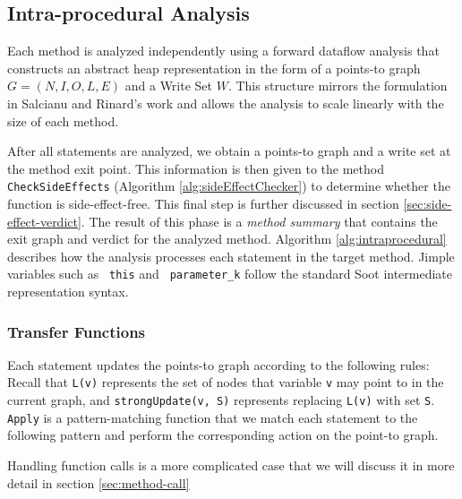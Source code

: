 \documentclass{article}
\begin{document}
\subsection{Intra-procedural Analysis}

Each method is analyzed independently using a forward dataflow analysis that constructs an abstract heap representation in the form of a points-to graph $G = (N, I, O, L, E)$ and a Write Set $W$. This structure mirrors the formulation in Salcianu and Rinard's work \cite{salcianu2005purity} and allows the analysis to scale linearly with the size of each method. 

After all statements are analyzed, we obtain a points-to graph and a write set at the method exit point. This information is then given to the method \texttt{CheckSideEffects} (Algorithm \ref{alg:sideEffectChecker}) to determine whether the function is side-effect-free. This final step is further discussed in section \ref{sec:side-effect-verdict}. 
The result of this phase is a \emph{method summary} that contains the exit graph and verdict for the analyzed method. 
Algorithm \ref{alg:intraprocedural} describes how the analysis processes each statement in the target method. Jimple variables such as \texttt{ this} and \texttt{ parameter\_k} follow the standard Soot intermediate representation syntax. 




\subsubsection{Transfer Functions}
Each statement updates the points-to graph according to the following rules: Recall that \texttt{L(v)} represents the set of nodes that variable \texttt{v} may point to in the current graph, and \texttt{strongUpdate(v, S)} represents replacing \texttt{L(v)} with set \texttt{S}. \texttt{Apply} is a pattern-matching function that we match each statement to the following pattern and perform the corresponding action on the point-to graph.



Handling function calls is a more complicated case that we will discuss it in more detail in section \ref{sec:method-call}
\end{document}
